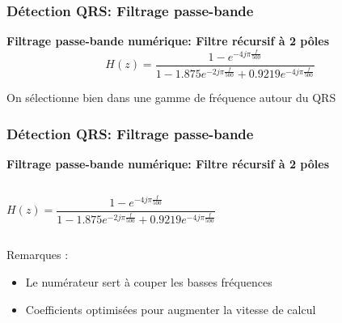 \documentclass{beamer}
\begin{document}
\begin{frame}
\frametitle{Détection QRS: Filtrage passe-bande}
 \textbf{Filtrage passe-bande numérique: Filtre récursif à  2 pôles}\\
\[H(z) = \frac{1 - e^{-4 j \pi \frac{f}{500}}}{1 - 1.875 e^{-2 j \pi \frac{f}{500}} + 0.9219  e^{-4 j \pi \frac{f}{500}}} \] 
\begin{center}
\end{center}
\vspace{0.3cm}
On sélectionne bien dans une gamme de fréquence autour du QRS
\end{frame}

\begin{frame}
\frametitle{Détection QRS: Filtrage passe-bande}
 \textbf{Filtrage passe-bande numérique: Filtre récursif à  2 pôles}\\
\begin{columns}
\column{60mm}
\[H(z) = \frac{1 - e^{-4 j \pi \frac{f}{500}}}{1 - 1.875 e^{-2 j \pi \frac{f}{500}} + 0.9219  e^{-4 j \pi \frac{f}{500}}} \]
\column{60mm} 
\begin{center}
\end{center}
\end{columns}
\vspace{0.3cm}
Remarques :
\begin{itemize}
\item Le numérateur sert à couper les basses fréquences
\item Coefficients optimisées pour augmenter la vitesse de calcul
\end{itemize}
\end{frame}
\end{document}
